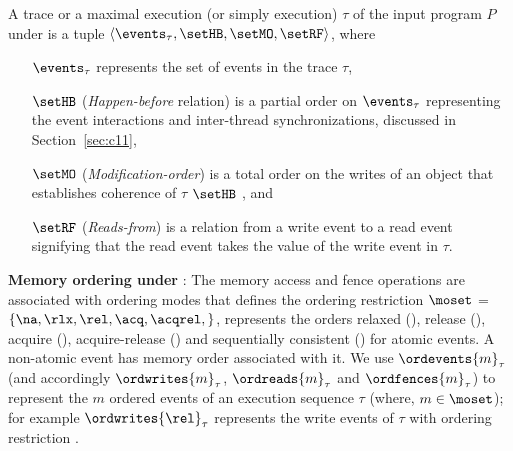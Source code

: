 \begin{definition}[Trace]\newline
{}
	A trace or a maximal execution (or simply execution) $\tau$ of the input 
	program $P$ under \cc is a tuple 
	$\langle \events_\tau, \setHB, \setMO, \setRF \rangle$, where
	\begin{itemize}[label=sethb,align=left,leftmargin=*]
		\item [$\events_\tau$] represents the set of events in the trace $\tau$,
		\item [$\setHB$] ({\em Happen-before} relation) is a partial order on
			$\events_\tau$ representing the event interactions and inter-thread
			synchronizations, discussed in Section~\ref{sec:c11},
		\item [$\setMO$] ({\em Modification-order}) is a total order on the
			writes of an object that establishes coherence of $\tau$ 
			\wrt $\setHB$ , and
		\item [$\setRF$] ({\em Reads-from}) is a relation from a write event to
			a read event signifying that the read event takes the value of 
			the write event in $\tau$.
	\end{itemize}
\end{definition}

\noindent
{\bf Memory ordering under \cc}: 
The memory access and fence operations are
associated with ordering modes
that defines the ordering restriction 
%
$\moset$ = $\{ \na, \rlx, \rel, \acq, \acqrel, \sc \}$, 
represents the orders relaxed (\rlx), release (\rel), acquire (\acq),
acquire-release (\acqrel) and sequentially consistent (\sc) for
atomic events. A non-atomic event has \na memory order associated with 
it.
%
We use $\ordevents{m}_\tau$ (and accordingly $\ordwrites{m}_\tau$, 
$\ordreads{m}_\tau$ and $\ordfences{m}_\tau$) to represent the $m$
ordered events of an execution sequence $\tau$ (where, $m \in \moset$);
for example $\ordwrites{\rel}_\tau$ represents the write events of 
$\tau$ with ordering restriction \rel. 

